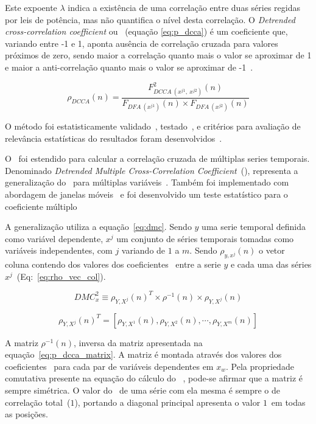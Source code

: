 Este expoente \(\lambda\) indica a existência de uma correlação entre duas séries regidas por leis de potência, mas não quantifica o nível desta correlação. O \emph{Detrended cross-correlation coefficient} ou \pdcca~(equação \ref{eq:p_dcca}) é um coeficiente que, variando entre -1 e 1, aponta ausência de correlação cruzada para valores próximos de zero, sendo maior a correlação quanto mais o valor se aproximar de 1 e maior a anti-correlação quanto mais o valor se aproximar de -1~\cite{Zebende2011}.


\begin{equation}
  {\rho}_{DCCA}(n) = \frac{F_{DCCA~(x^{j1},~x^{j2})}^{2}(n)}
  {F_{DFA~(x^{j1})}(n) \times F_{DFA~(x^{j2})}(n)}
  \label{eq:p_dcca}
\end{equation}

O método foi estatisticamente validado~\cite{PhysRevE.84.066118}, testado~\cite{vassolerZebende2012, Guedes2017, Ferreira2018},
e critérios para avaliação de relevância estatísticas do resultados foram desenvolvidos~\cite{Guedes2018,Guedes2018a}.

O \pdcca~foi estendido para calcular a correlação cruzada de múltiplas series temporais. Denominado \emph{Detrended Multiple Cross-Correlation Coefficient}~(\dmc), representa a generalização do \pdcca~para múltiplas variáveis~\cite{Zebende2018}. Também foi implementado com abordagem de janelas móveis~\cite{Guedes2021} e foi desenvolvido um teste estatístico para o coeficiente múltiplo~\cite{DaSilvaFilho2021}

A generalização utiliza a equação~\ref{eq:dmc}. Sendo $y$ uma serie temporal definida como variável dependente, $x^{j}$ um conjunto de séries temporais tomadas como variáveis independentes, com $j$ variando de $1$ a $m$. Sendo $\rho_{y,x^{j}}(n)$ o vetor coluna contendo dos valores dos coeficientes \pdcca~entre a serie $y$ e cada uma das séries $x^{j}$~(Eq:~\ref{eq:rho_vec_col}). 

\begin{equation}
  {DMC}_{x}^{2}  \equiv \rho_{Y,X^{j}}(n)^{T} \times \rho^{-1}(n) \times \rho_{Y,X^{j}}(n)
  \label{eq:dmc}
\end{equation}

\begin{equation} \label{eq:rho_vec_col}
  \rho_{Y,X^{j}}(n)^T=[\rho_{Y,X^1}(n), \rho_{Y,X^2}(n),\cdots,\rho_{Y,X^m}(n)]
\end{equation}

A matriz  $\rho^{-1}(n)$, inversa da matriz apresentada na equação~\ref{eq:p_dcca_matrix}. A matriz é montada através dos valores dos coeficientes \pdcca~para cada par de variáveis dependentes em $x_{w}$. Pela propriedade comutativa presente na equação do cálculo do \pdcca~, pode-se afirmar que a matriz é sempre simétrica. O valor do \pdcca~de uma série com ela mesma é sempre o de correlação total~($1$), portando a diagonal principal apresenta o valor $1$~em todas as posições.


